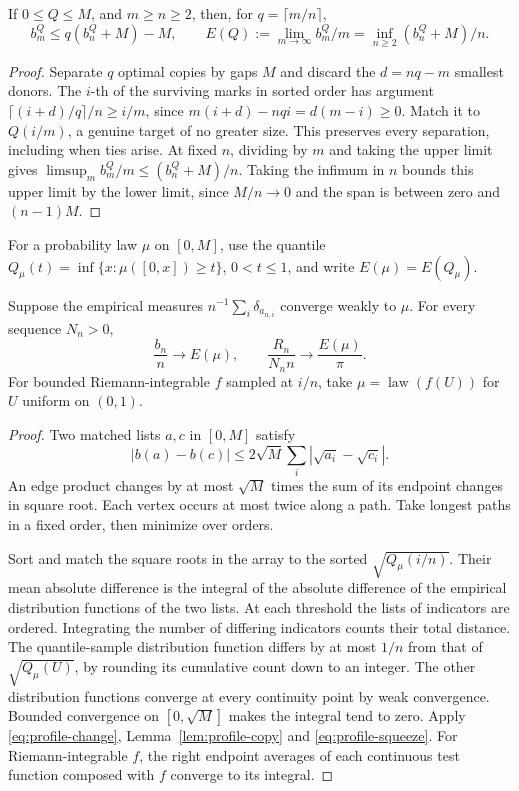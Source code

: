 \begin{lemma}[Replication]\label{lem:profile-copy}
If \(0\le Q\le M\), and \(m\ge n\ge2\), then, for \(q=\lceil m/n\rceil\),
\[
 b_m^Q\le q(b_n^Q+M)-M,\qquad
 E(Q):=\lim_{m\to\infty} b_m^Q/m=\inf_{n\ge2}(b_n^Q+M)/n .
\]
\end{lemma}
\begin{proof}
Separate \(q\) optimal copies by gaps \(M\) and discard
the \(d=nq-m\) smallest donors. The \(i\)-th of the surviving marks in
sorted order has argument \(\lceil(i+d)/q\rceil/n\ge i/m\), since
\(m(i+d)-nqi=d(m-i)\ge0\). Match it to \(Q(i/m)\), a genuine target
of no greater size. This preserves every separation, including when ties
arise. At fixed \(n\), dividing by \(m\) and taking the upper limit
gives \(\limsup_m b_m^Q/m\le(b_n^Q+M)/n\). Taking the infimum in \(n\)
bounds this upper limit by the lower limit, since \(M/n\to0\) and the
span is between zero and \((n-1)M\).
\end{proof}

For a probability law \(\mu\) on \([0,M]\), use the quantile
\(Q_\mu(t)=\inf\{x:\mu([0,x])\ge t\}\), \(0<t\le1\), and write
\(E(\mu)=E(Q_\mu)\).

\begin{theorem}\label{thm:profile-law}
Suppose the empirical measures \(n^{-1}\sum_i\delta_{a_{n,i}}\)
converge weakly to \(\mu\). For every sequence \(N_n>0\),
\[
 \frac{b_n}{n}\longrightarrow E(\mu),\qquad
 \frac{R_n}{N_n n}\longrightarrow\frac{E(\mu)}{\pi}.
\]
For bounded Riemann-integrable \(f\) sampled at \(i/n\), take
\(\mu=\operatorname{law}(f(U))\) for \(U\) uniform on \((0,1)\).
\end{theorem}
\begin{proof}
Two matched lists \(a,c\) in \([0,M]\) satisfy
\begin{equation}\label{eq:profile-change}
 |b(a)-b(c)|\le 2\sqrt M\sum_i|\sqrt{a_i}-\sqrt{c_i}|.
\end{equation}
An edge product changes by at most \(\sqrt M\) times the sum of its
endpoint changes in square root. Each vertex occurs at most twice along
a path. Take longest paths in a fixed order, then minimize over orders.

Sort and match the square roots in the array to the sorted
\(\sqrt{Q_\mu(i/n)}\). Their mean absolute difference is the integral
of the absolute difference of the empirical distribution functions of
the two lists. At each threshold the lists of indicators are ordered. Integrating the number of differing indicators counts their total
distance. The quantile-sample distribution function differs by at most
\(1/n\) from that of \(\sqrt{Q_\mu(U)}\), by rounding its cumulative count
down to an integer. The other distribution functions converge at every
continuity point by weak convergence. Bounded convergence on \([0,\sqrt M]\)
makes the integral tend to zero. Apply \eqref{eq:profile-change},
Lemma~\ref{lem:profile-copy} and \eqref{eq:profile-squeeze}.
For Riemann-integrable \(f\), the right endpoint averages of each
continuous test function composed with \(f\) converge to its integral.
\end{proof}

